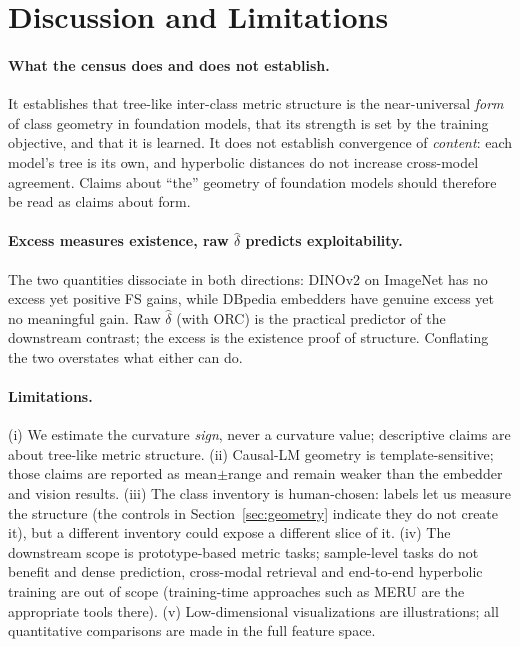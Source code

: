 \documentclass{article} %
\begin{document}
\section{Discussion and Limitations}
\label{sec:discussion}

\paragraph{What the census does and does not establish.} It establishes that tree-like inter-class metric structure is the near-universal \emph{form} of class geometry in foundation models, that its strength is set by the training objective, and that it is learned. It does not establish convergence of \emph{content}: each model's tree is its own, and hyperbolic distances do not increase cross-model agreement. Claims about ``the'' geometry of foundation models should therefore be read as claims about form.

\paragraph{Excess measures existence, raw $\hat\delta$ predicts exploitability.} The two quantities dissociate in both directions: DINOv2 on ImageNet has no excess yet positive FS gains, while DBpedia embedders have genuine excess yet no meaningful gain. Raw $\hat\delta$ (with ORC) is the practical predictor of the downstream contrast; the excess is the existence proof of structure. Conflating the two overstates what either can do.

\paragraph{Limitations.} (i) We estimate the curvature \emph{sign}, never a curvature value; descriptive claims are about tree-like metric structure. (ii) Causal-LM geometry is template-sensitive; those claims are reported as mean$\pm$range and remain weaker than the embedder and vision results. (iii) The class inventory is human-chosen: labels let us measure the structure (the controls in Section~\ref{sec:geometry} indicate they do not create it), but a different inventory could expose a different slice of it. (iv) The downstream scope is prototype-based metric tasks; sample-level tasks do not benefit and dense prediction, cross-modal retrieval and end-to-end hyperbolic training are out of scope (training-time approaches such as MERU are the appropriate tools there). (v) Low-dimensional visualizations are illustrations; all quantitative comparisons are made in the full feature space.
\end{document}
